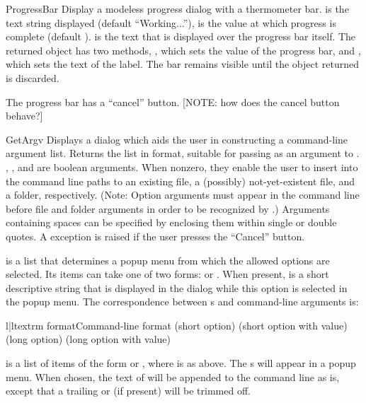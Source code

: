 \begin{funcdesc}{ProgressBar}{}
Display a modeless progress dialog with a thermometer bar. 
is the text string displayed (default ``Working...''),  is
the value at which progress is complete (default
).  is the text that is displayed over the progress
bar itself.  The returned object has two methods,
, which sets the value of the progress bar, and
, which sets the text of the label. The bar
remains visible until the object returned is discarded.

The progress bar has a ``cancel'' button. [NOTE: how does the cancel
button behave?]
\end{funcdesc}


\begin{funcdesc}{GetArgv}{}
Displays a dialog which aids the user in constructing a command-line
argument list.  Returns the list in  format, suitable for
passing as an argument to .  ,
, and  are boolean arguments.  When
nonzero, they enable the user to insert into the command line paths to
an existing file, a (possibly) not-yet-existent file, and a folder,
respectively.  (Note: Option arguments must appear in the command line
before file and folder arguments in order to be recognized by
.)  Arguments containing spaces can be
specified by enclosing them within single or double quotes.  A
 exception is raised if the user presses the
``Cancel'' button.

 is a list that determines a popup menu from which the
allowed options are selected.  Its items can take one of two forms:
 or .  When present,
 is a short descriptive string that is displayed in the
dialog while this option is selected in the popup menu.  The
correspondence between s and command-line arguments is:

\begin{tableii}{l|l}{textrm}{ format}{Command-line format}
       { (short option)}
       { (short option with value)}
       { (long option)}
       { (long option with value)}
\end{tableii}

 is a list of items of the form  or
, where  is as above.  The
s will appear in a popup menu.  When chosen, the text of
 will be appended to the command line as is, except that a
trailing \character{:} or \character{=} (if present) will be trimmed
off.

\end{funcdesc}
